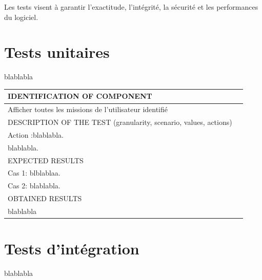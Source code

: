 \documentclass{polytech/polytech}
\numberwithin{figure}{chapter}
\begin{document}
\begin{appendix}
Les tests  visent à garantir l'exactitude,
l'intégrité, la sécurité et les performances du logiciel. 

\section{Tests unitaires}

blablabla

\begin{table}[]
\begin{tabular}{|l|l|}\hline
\color{C} IDENTIFICATION OF COMPONENT \\\hline
Afficher toutes les missions de l'utilisateur identifié  \\\hline
\color{C} DESCRIPTION OF THE TEST (granularity, scenario, values, actions) \\\hline
Action :blablabla.\\ blablabla. \\\hline
\color{C} EXPECTED RESULTS \\\hline
Cas 1: blblablaa.\\ Cas 2: blablabla. \\\hline
\color{C} OBTAINED RESULTS \\\hline
blablabla \\\hline
\end{tabular}
\end{table}                                                                             

\section{Tests d'intégration}

blablabla

\end{appendix}
\end{document}
